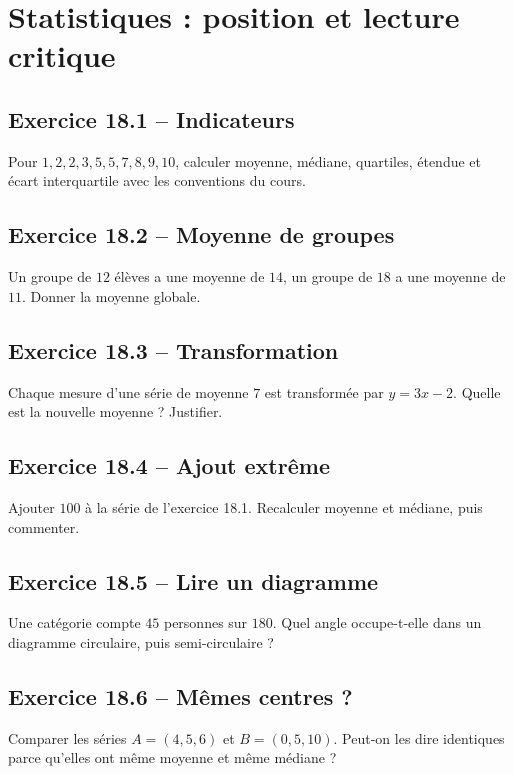 \chapter{Statistiques : position et lecture critique}
\section*{Exercice 18.1 -- Indicateurs}
Pour $1,2,2,3,5,5,7,8,9,10$, calculer moyenne, médiane, quartiles, étendue et écart interquartile avec les conventions du cours.

\section*{Exercice 18.2 -- Moyenne de groupes}
Un groupe de $12$ élèves a une moyenne de $14$, un groupe de $18$ a une moyenne de $11$. Donner la moyenne globale.

\section*{Exercice 18.3 -- Transformation}
Chaque mesure d'une série de moyenne $7$ est transformée par $y=3x-2$. Quelle est la nouvelle moyenne ? Justifier.

\section*{Exercice 18.4 -- Ajout extrême}
Ajouter $100$ à la série de l'exercice 18.1. Recalculer moyenne et médiane, puis commenter.

\section*{Exercice 18.5 -- Lire un diagramme}
Une catégorie compte $45$ personnes sur $180$. Quel angle occupe-t-elle dans un diagramme circulaire, puis semi-circulaire ?

\section*{Exercice 18.6 -- Mêmes centres ?}
Comparer les séries $A=(4,5,6)$ et $B=(0,5,10)$. Peut-on les dire identiques parce qu'elles ont même moyenne et même médiane ?
